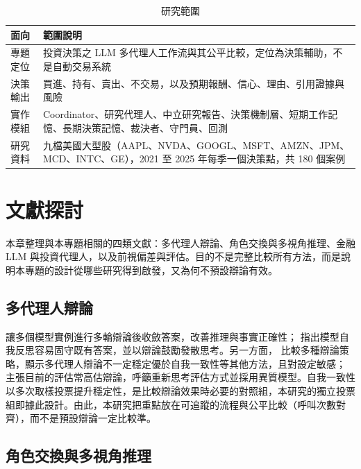 \documentclass[12pt,a4paper]{article}
\begin{document}
\begin{CJK}{UTF8}{bkai}
\begin{table}[H]
\centering\small
\caption{研究範圍}
\label{tab:scope}
\begin{tabularx}{\textwidth}{@{}l Y@{}}
\toprule
面向 & 範圍說明 \\
\midrule
專題定位 & 投資決策之 LLM 多代理人工作流與其公平比較，定位為決策輔助，不是自動交易系統 \\
決策輸出 & 買進、持有、賣出、不交易，以及預期報酬、信心、理由、引用證據與風險 \\
實作模組 & Coordinator、研究代理人、中立研究報告、決策機制層、短期工作記憶、長期決策記憶、裁決者、守門員、回測 \\
研究資料 & 九檔美國大型股（AAPL、NVDA、GOOGL、MSFT、AMZN、JPM、MCD、INTC、GE），2021 至 2025 年每季一個決策點，共 180 個案例 \\
\bottomrule
\end{tabularx}
\end{table}

\section{文獻探討}
\label{sec:related}

本章整理與本專題相關的四類文獻：多代理人辯論、角色交換與多視角推理、金融 LLM 與投資代理人，以及前視偏差與評估。目的不是完整比較所有方法，而是說明本專題的設計從哪些研究得到啟發，又為何不預設辯論有效。

\subsection{多代理人辯論}

\citet{du2023debate} 讓多個模型實例進行多輪辯論後收斂答案，改善推理與事實正確性；\citet{liang2023divergent} 指出模型自我反思容易固守既有答案，並以辯論鼓勵發散思考。另一方面，\citet{smit2023mad} 比較多種辯論策略，顯示多代理人辯論不一定穩定優於自我一致性等其他方法，且對設定敏感；\citet{zhang2025stop} 主張目前的評估常高估辯論，呼籲重新思考評估方式並採用異質模型。自我一致性 \citep{wang2023selfconsistency} 以多次取樣投票提升穩定性，是比較辯論效果時必要的對照組，本研究的獨立投票組即據此設計。由此，本研究把重點放在可追蹤的流程與公平比較（呼叫次數對齊），而不是預設辯論一定比較準。

\subsection{角色交換與多視角推理}


\end{CJK}
\end{document}
